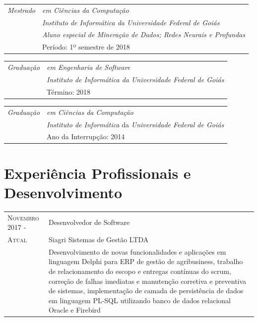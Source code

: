 \documentclass[12pt, oneside, openany, a4paper, english, brazil]{abntex2}
\begin{document}
\begin{tabular}{p{2.2cm}|p{12cm}}
    \emph{Mestrado}
    & \emph{em Ciências da Computação} \\
    & \emph{Instituto de Informática da Universidade Federal de Goiás} \\
    & \emph{Aluno especial de Mineração de Dados; Redes Neurais e Profundas} \\
    & Período: 1º semestre de 2018 \\
\end{tabular}

\begin{tabular}{p{2.2cm}|p{12cm}}
    \emph{Graduação}
    & \emph{em Engenharia de Software} \\
    & \emph{Instituto de Informática da Universidade Federal de Goiás} \\
    & Término: 2018\\
\end{tabular}

\begin{tabular}{p{2.2cm}|p{12cm}}
    \emph{Graduação}
    & \emph{em Ciências da Computação}\\
    & \emph{Instituto de Informática} da \emph{Universidade Federal de Goiás} \\
    & Ano da Interrupção: 2014\\
\end{tabular}


\section{Experiência Profissionais e Desenvolvimento}

\begin{tabular}{p{3.5cm}p{11cm}}
    \textsc{Novembro 2017} - & Desenvolvedor de Software \\
    \textsc{Atual} & Siagri Sistemas de Gestão LTDA \\
    \textsc{} & Desenvolvimento de novas funcionalidades e aplicações em linguagem Delphi para ERP de gestão de agribusiness, trabalho de relacionamento do escopo e entregas contínuas do scrum, correção de falhas imediatas e manutenção corretiva e preventiva de sistemas, implementação de camada de persistência de dados em linguagem PL-SQL utilizando banco de dados relacional Oracle e Firebird
\end{tabular}
\end{document}
